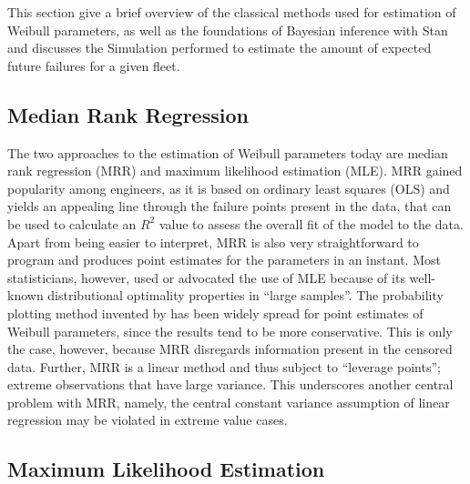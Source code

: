 This section give a brief overview of the classical methods used for estimation of Weibull parameters, as well as the foundations of Bayesian inference with Stan and discusses the Simulation performed to estimate the amount of expected future failures for a given fleet.
\subsection{Median Rank Regression}

The two approaches to the estimation of Weibull parameters today are median rank regression (MRR) and maximum likelihood estimation (MLE). MRR gained popularity among engineers, as it is based on ordinary least squares (OLS) and yields an appealing line through the failure points present in the data, that can be used to calculate an $R^{2}$ value to assess the overall fit of the model to the data. Apart from being easier to interpret, MRR is also very straightforward to program and produces point estimates for the parameters in an instant. Most statisticians, however, used or advocated the use of MLE because of its well-known distributional optimality properties in ``large samples''. \cite{mlandmrrcomparison} The probability plotting method invented by \cite{herd1960} has been widely spread for point estimates of Weibull parameters, since the results tend to be more conservative. This is only the case, however, because MRR disregards information present in the censored data. Further, MRR is a linear method and thus subject to ``leverage points''; extreme observations that have large variance. This underscores another central problem with MRR, namely, the central constant variance assumption of linear regression may be violated in extreme value cases.
\subsection{Maximum Likelihood Estimation}

